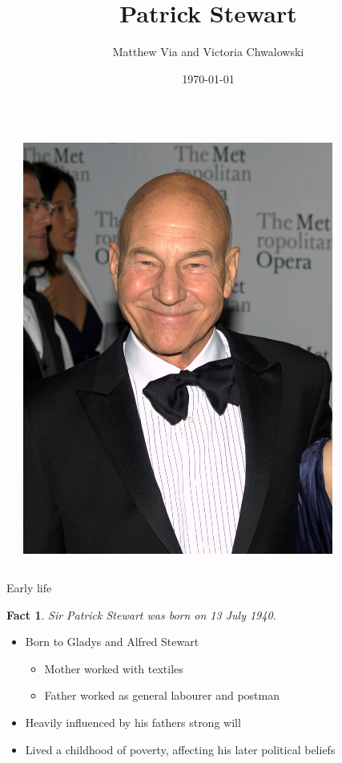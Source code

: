 \documentclass[xcolor=dvipsnames]{beamer}
\begin{document}
\author{Matthew Via and Victoria Chwalowski}
\title{Patrick Stewart}
\date{\today}
\newtheorem{fct}{Fact}
\newtheorem{qct}{Quote}
\begin{frame}{}
  \begin{columns}
    \begin{column}{0.5\textwidth}
      \titlepage
    \end{column}
    \begin{column}{0.5\textwidth}
      \begin{center}
        \includegraphics[width=0.8\textwidth]{smile.jpg}
      \end{center}
    \end{column}
  \end{columns}
\end{frame}

\begin{frame}{Early life}
  \begin{fct}
    Sir Patrick Stewart was born on 13 July 1940.
  \end{fct}
  \begin{itemize}
    \item Born to Gladys and Alfred Stewart
    \begin{itemize}
      \item Mother worked with textiles
      \item Father worked as general labourer and postman
    \end{itemize}
    \item Heavily influenced by his fathers strong will
    \item Lived a childhood of poverty, affecting his later political beliefs
  \end{itemize}
\end{frame}
\end{document}
